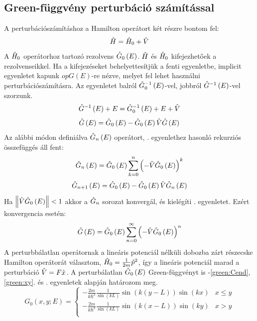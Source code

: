 \subsection{Green-függvény perturbáció számítással}
A perturbációszámításhoz a Hamilton operátort két részre bontom fel:
\begin{equation}
	\hat{H} = \hat{H}_0 + \hat{V}
\end{equation}
A $\hat{H}_0$ operátorhoz tartozó rezolvens $\hat{G}_0\left(E\right)$. $\hat{H}$ és $\hat{H}_0$ kifejezhetőek a rezolvenseikkel. Ha a kifejezéseket behelyettesítjük a fenti egyenletbe, implicit egyenletet kapunk $op{G}\left(E\right)$-re nézve, melyet fel lehet használni perturbációszámításra. Az egyenletet balról $\hat{G}_0^{-1}\left(E\right)$-vel, jobbról $\hat{G}^{-1}\left(E\right)$-vel szorzunk.
\begin{equation}
	\hat{G}^{-1}\left(E\right) + E = \hat{G}_0^{-1}\left(E\right) + E + \hat{V}
\end{equation}
\begin{equation}
	\hat{G}\left(E\right) = \hat{G}_0\left(E\right) - \hat{G}_0\left(E\right)\hat{V}\hat{G}\left(E\right)
	\label{green:pertmaster}
\end{equation}
Az alábbi módon definiálva $\hat{G}_n\left(E\right)$ operátort, . egyenlethez hasonló rekurziós összefüggés áll fent:
\begin{equation}
	\hat{G}_n\left(E\right) = \hat{G}_0\left(E\right)\sum_{k=0}^n\left(-\hat{V}\hat{G}_0\left(E\right)\right)^k
\end{equation}
\begin{equation}
	\hat{G}_{n+1}\left(E\right) = \hat{G}_0\left(E\right) - \hat{G}_0\left(E\right)\hat{V}\hat{G}_n\left(E\right)
\end{equation}
Ha $\left\lVert \hat{V}\hat{G}_0\left(E\right) \right\rVert < 1$ akkor a $\hat{G}_n$ sorozat konvergál, és kielégíti . egyenletet. Ezért konvergencia esetén:
\begin{equation}
	\hat{G}\left(E\right) = \hat{G}_0\left(E\right)\sum_{n=0}^\infty\left(-\hat{V}\hat{G}_0\left(E\right)\right)^n
\end{equation}
A perturbbálatlan operátornak a lineáris potenciál nélküli dobozba zárt részecske Hamilton operátorát választom, $\hat{H}_0=\frac{1}{2m}\hat{p}^2$, így a lineáris potenciál marad a perturbáció $\hat{V} = F\hat{x}$. A perturbálatlan $\hat{G}_0\left(E\right)$ Green-függvényt is -\ref{green:Cend}, \ref{green:xy}. és . egyenletek alapján határozom meg.
\begin{equation}
	G_0\left(x,y;E\right) =
	\begin{cases}
		-\frac{2m}{k\hbar^2}\frac{1}{\sin\left(kL\right)} \sin\left(k\left(y-L\right)\right)\sin\left(kx\right) & x\leq y\\
		-\frac{2m}{k\hbar^2}\frac{1}{\sin\left(kL\right)} \sin\left(k\left(x-L\right)\right)\sin\left(ky\right) & x>y\\
	\end{cases}
\end{equation}
